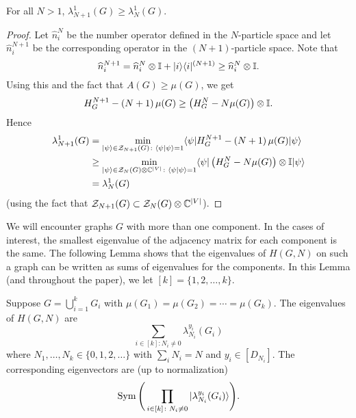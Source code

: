 \documentclass[../thesis-main/thesis-main]{subfiles}
\begin{document}
\begin{lemma}
  For all $N>1$, $\lambda_{N+1}^1(G) \geq \lambda_{N}^1(G)$.
\end{lemma}
\begin{proof}
Let $\widehat{n}_{i}^{N}$ be the number operator  defined in the $N$-particle space and let $\widehat{n}_{i}^{N+1}$ be the corresponding operator in the $\left(N+1\right)$-particle space. Note that
\begin{equation}
\widehat{n}_{i}^{N+1} = \widehat{n}_{i}^{N}\otimes\mathbb{I}+|i\rangle\langle i|^{(N+1)} \geq \widehat{n}_{i}^{N}\otimes\mathbb{I}.
\end{equation}
Using this and the fact that $A(G)\geq\mu(G)$, we get 
\begin{equation}
H_{G}^{N+1}-\left(N+1\right)\mu(G)\geq\left(H_{G}^{N}-N\mu(G)\right)\otimes\mathbb{I}.
\end{equation}
Hence 
\begin{align}
  \lambda_{N+1}^{1}(G) & =\min_{|\psi\rangle\in\mathcal{Z}_{N+1}(G)\colon \langle\psi|\psi\rangle=1}\langle\psi|H_{G}^{N+1}-\left(N+1\right)\mu(G)|\psi\rangle\\
 & \geq\min_{|\psi\rangle\in\mathcal{Z}_{N}(G)\otimes\mathbb{C}^{|V|}\colon \langle\psi|\psi\rangle=1}\langle\psi|\left(H_{G}^{N}-N\mu(G)\right)\otimes\mathbb{I} |\psi\rangle\\
 & =\lambda_{N}^{1}(G)
\end{align}
(using the fact that $\mathcal{Z}_{N+1}(G)\subset\mathcal{Z}_{N}(G)\otimes\mathbb{C}^{|V|}$). 
\end{proof}
We will encounter graphs $G$ with more than one component. In the cases of interest, the smallest eigenvalue of the adjacency matrix for each component is the same. The following Lemma shows that the eigenvalues of $H(G,N)$ on such a graph can be written as sums of eigenvalues for the components. In this Lemma (and throughout the paper), we let $[k] = \{1,2,\ldots,k\}$.

\begin{lemma}
\label{lem:BH_disconnected_graphs}
Suppose $G=\bigcup_{i=1}^{k}G_{i}$ with $\mu(G_{1})=\mu(G_{2})=\cdots=\mu(G_{k})$. The eigenvalues of $H(G,N)$ are 
\begin{equation}
\sum_{i\in[k]\colon N_{i}\neq0}\lambda_{N_{i}}^{y_{i}}(G_{i})
\end{equation}
where $N_{1},\ldots,N_{k}\in\{0,1,2,\ldots\}$ with $\sum_{i}N_{i}=N$ and $y_{i}\in[D_{N_{i}}].$ The corresponding eigenvectors are (up to normalization) 
\begin{equation}
\operatorname{Sym}\Bigg(\prod_{i\in[k]\colon N_{i}\neq0}|\lambda_{N_{i}}^{y_{i}}(G_{i})\rangle\Bigg).
\label{eq:eigvecs_disconnected}
\end{equation}
\end{lemma}
\end{document}
